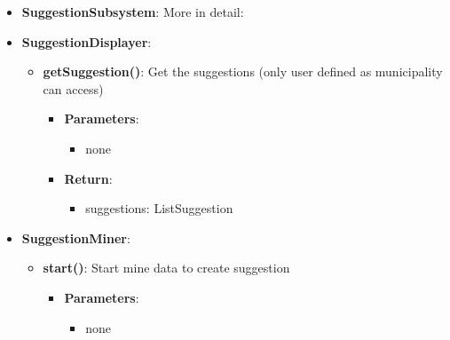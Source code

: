 \documentclass{article}
\begin{document}
\begin{itemize}
\begin{itemize}
\begin{itemize}
\begin{itemize}
						\end{itemize}
				\end{itemize}
		\end{itemize}
	\item \textbf{SuggestionSubsystem}: More in detail:
	\item \textbf{SuggestionDisplayer}:
		\begin{itemize}
			\item \textbf{getSuggestion()}:
			Get the suggestions (only user defined as municipality can access)
				\begin{itemize}
					\item \textbf{Parameters}:
						\begin{itemize}
							\item none
						\end{itemize}
					\item \textbf{Return}:
						\begin{itemize}
							\item suggestions: List\textlangle{}Suggestion\textrangle{}
						\end{itemize}
				\end{itemize}
		\end{itemize}
	\item \textbf{SuggestionMiner}:
		\begin{itemize}
			\item \textbf{start()}:
			Start mine data to create suggestion
				\begin{itemize}
					\item \textbf{Parameters}:
						\begin{itemize}
							\item none
						\end{itemize}
				\end{itemize}
		\end{itemize}
\end{itemize}

\newpage
\end{document}
